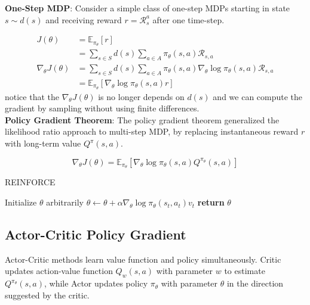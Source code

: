 \noindent \textbf{One-Step MDP}: Consider a simple class of one-step MDPs starting in state $s
    \sim d(s)$ and receiving reward $r = \mathcal{R}_s^a$ after one time-step.

\begin{align*}
    J(\theta)               & = \mathbb{E}_{\pi_\theta}[r]                                                                              \\
                            & = \sum_{s \in S} d(s) \sum_{a \in A} \pi_\theta(s,a) \mathcal{R}_{s,a}                                    \\
    \nabla_\theta J(\theta) & = \sum_{s \in S} d(s) \sum_{a \in A} \pi_\theta(s,a) \nabla_\theta \log \pi_\theta(s,a) \mathcal{R}_{s,a} \\
                            & = \mathbb{E}_{\pi_\theta}[\nabla_\theta \log \pi_\theta(s,a) r]
\end{align*}
notice that the $\nabla_\theta J(\theta)$ is no longer depends on $d(s)$ and we can compute the gradient by sampling without using finite differences.\\

\noindent \textbf{Policy Gradient Theorem}: The policy gradient theorem generalized the likelihood
ratio approach to multi-step MDP, by replacing instantaneous reward $r$ with
long-term value $Q^\pi(s,a)$.

\[
    \nabla_\theta J(\theta) = \mathbb{E}_{\pi_\theta}[\nabla_\theta \log \pi_\theta(s,a) Q^{\pi_\theta}(s,a)]
\]

\begin{algorithm}[H]
    \caption{REINFORCE}
    \begin{algorithmic}
        \State Initialize $\theta$ arbitrarily
        \State $\theta \leftarrow \theta + \alpha \nabla_\theta \log \pi_\theta(s_t, a_t) v_t$
        \EndFor
        \EndFor
        \State \textbf{return} $\theta$
    \end{algorithmic}
\end{algorithm}

\subsection{Actor-Critic Policy Gradient}

Actor-Critic methods learn value function and policy simultaneously. Critic
updates action-value function $Q_w(s,a)$ with parameter $w$ to estimate
$Q^{\pi_\theta}(s,a)$, while Actor updates policy $\pi_\theta$ with parameter
$\theta$ in the direction suggested by the critic.

